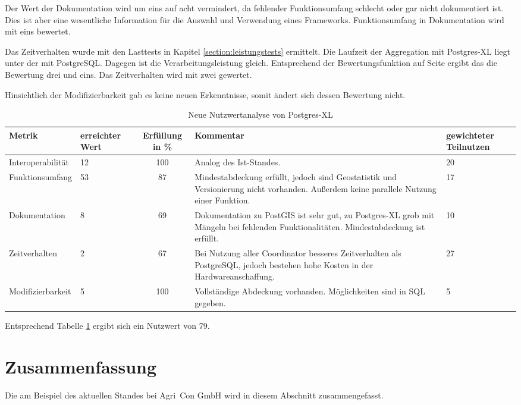 Der Wert der Dokumentation wird um eins auf acht vermindert, da fehlender Funktionsumfang schlecht oder gar nicht dokumentiert ist.
Dies ist aber eine wesentliche Information für die Auswahl und Verwendung eines Frameworks.
Funktionsumfang in Dokumentation wird mit eins bewertet.

Das Zeitverhalten wurde mit den Lasttests in Kapitel \ref{section:leistungstests} ermittelt.
Die Laufzeit der Aggregation mit Postgres-XL liegt unter der mit PostgreSQL.
Dagegen ist die Verarbeitungsleistung gleich.
Entsprechend der Bewertungsfunktion auf Seite \pageref{bf:zeitverhalten} ergibt das die Bewertung drei und eins.
Das Zeitverhalten wird mit zwei gewertet.

Hinsichtlich der Modifizierbarkeit gab es keine neuen Erkenntnisse, somit ändert sich dessen Bewertung nicht.

\begin{table}[h!]
\centering
\small
\begin{tabular}{l|p{1.8cm}|c|p{3.1cm}|p{1.8cm}}
\textbf{Metrik} & \textbf{erreichter Wert} & \textbf{Erfüllung in \%} & \textbf{Kommentar} & \textbf{gewichteter Teilnutzen} \\ \hline
Interoperabilität & 12 & 100 & Analog des Ist-Standes. & 20 \\ \hline
Funktionsumfang & 53 & 87 & Mindestabdeckung erfüllt, jedoch sind Geostatistik und Versionierung nicht vorhanden. Außerdem keine parallele Nutzung einer Funktion. & 17 \\ \hline
Dokumentation & 8 & 69 & Dokumentation zu PostGIS ist sehr gut, zu Postgres-XL grob mit Mängeln bei fehlenden Funktionalitäten. Mindestabdeckung ist erfüllt. & 10 \\ \hline
Zeitverhalten & 2 & 67 & Bei Nutzung aller Coordinator besseres Zeitverhalten als PostgreSQL, jedoch bestehen hohe Kosten in der Hardwareanschaffung. & 27 \\ \hline
Modifizierbarkeit & 5 & 100 & Vollständige Abdeckung vorhanden. Möglichkeiten sind in SQL gegeben. & 5 \\
\end{tabular}
\caption{Neue Nutzwertanalyse von Postgres-XL}
\label{table:nutzwertanalyse2-postgresxl}
\end{table}
Entsprechend Tabelle \ref{table:nutzwertanalyse2-postgresxl} ergibt sich ein Nutzwert von 79.

\section{Zusammenfassung}
Die \titel{} am Beispiel des aktuellen Standes bei Agri~Con GmbH wird in diesem Abschnitt zusammengefasst.

